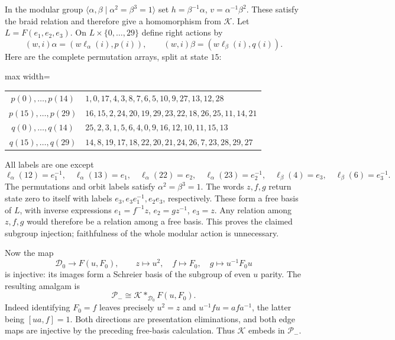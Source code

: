\documentclass[11pt]{amsart}
\theoremstyle{definition}
\theoremstyle{remark}
\begin{document}
In the modular group $\langle\alpha,\beta\mid\alpha^2=\beta^3=1\rangle$
set $h=\beta^{-1}\alpha$, $v=\alpha^{-1}\beta^2$. These satisfy
the braid relation and therefore give a homomorphism from $\mathcal K$.
Let $L=F(e_1,e_2,e_3)$. On $L\times\{0,\ldots,29\}$ define
right actions by
\[
 (w,i)\alpha=(w\ell_\alpha(i),p(i)),\qquad
 (w,i)\beta=(w\ell_\beta(i),q(i)).
\]
Here are the complete permutation arrays, split at state $15$:
\begin{center}
\begin{adjustbox}{max width=\textwidth}
\begin{tabular}{cl}
\toprule
$p(0),\ldots,p(14)$&$1,0,17,4,3,8,7,6,5,10,9,27,13,12,28$\\
$p(15),\ldots,p(29)$&$16,15,2,24,20,19,29,23,22,18,26,25,11,14,21$\\
$q(0),\ldots,q(14)$&$25,2,3,1,5,6,4,0,9,16,12,10,11,15,13$\\
$q(15),\ldots,q(29)$&$14,8,19,17,18,22,20,21,24,26,7,23,28,29,27$\\
\bottomrule
\end{tabular}
\end{adjustbox}
\end{center}
All labels are one except
\[
 \ell_\alpha(12)=e_1^{-1},\quad\ell_\alpha(13)=e_1,
 \quad\ell_\alpha(22)=e_2,\quad\ell_\alpha(23)=e_2^{-1},
 \quad\ell_\beta(4)=e_3,\quad\ell_\beta(6)=e_3^{-1}.
\]
The permutations and orbit labels satisfy $\alpha^2=\beta^3=1$.
The words $z,f,g$ return state zero to itself with labels
$e_3,e_3e_1^{-1},e_2e_3$, respectively. These form a free basis of
$L$, with inverse expressions $e_1=f^{-1}z$, $e_2=gz^{-1}$,
$e_3=z$. Any relation among $z,f,g$ would therefore be a relation
among a free basis. This proves the claimed subgroup injection;
faithfulness of the whole modular action is unnecessary.

Now the map
\[
 \mathcal D_0\longrightarrow F(u,F_0),\qquad
       z\mapsto u^2,\quad f\mapsto F_0,\quad g\mapsto u^{-1}F_0u
\]
is injective: its images form a Schreier basis of the subgroup of
even $u$ parity. The resulting amalgam is
\begin{equation}\label{eq:finite-amalgam}
                    \mathcal P_-\cong\mathcal K*_{\mathcal D_0}F(u,F_0).
\end{equation}
Indeed identifying $F_0=f$ leaves precisely $u^2=z$ and
$u^{-1}fu=afa^{-1}$, the latter being $[ua,f]=1$.
Both directions are presentation eliminations, and both edge maps
are injective by the preceding free-basis calculation. Thus $\mathcal K$
embeds in $\mathcal P_-$.
\end{document}
